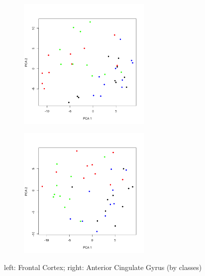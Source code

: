 \begin{figure}
\begin{subfigure}[t]{0.5\linewidth}
\centering
\includegraphics[width=0.7\textwidth]{./Figures/fig2/Fig2-Frontal-Cortex.png}\par
\end{subfigure}%
\begin{subfigure}[t]{0.5\linewidth}
\centering
\includegraphics[width=0.7\textwidth]{./Figures/fig2/Fig2-Anterior-Cingulate-Gyrus.png}\par
\end{subfigure}%
\caption{\label{fig2} left: Frontal Cortex; right: Anterior Cingulate Gyrus (by classes)}
\end{figure}

